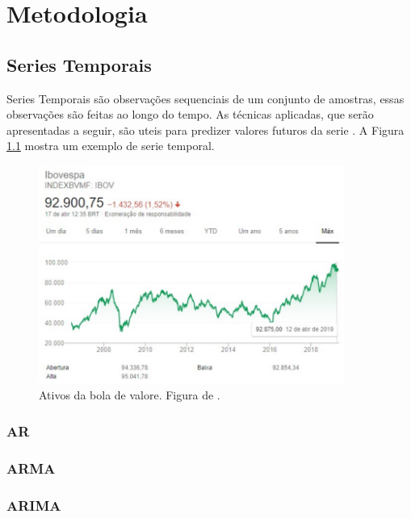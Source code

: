 \chapter{Metodologia}
\label{chap:metodologia}


\section{Series Temporais}
Series Temporais são observações sequenciais de um conjunto de amostras, essas observações são feitas ao longo
do tempo. As técnicas aplicadas, que serão apresentadas a seguir, são uteis para predizer valores futuros da serie
\cite{Mesquita_2019}. A Figura \ref{fig:serie} mostra um exemplo de serie temporal.

\begin{figure}[h]
    \centering
    \includegraphics[width=10cm]{figuras/SVM_1.png}
    \caption{Ativos da bola de valore. Figura de \cite{Mesquita_2019}.}
    \label{fig:serie}
\end{figure}



\subsection{AR}

\subsection{ARMA}

\subsection{ARIMA}
